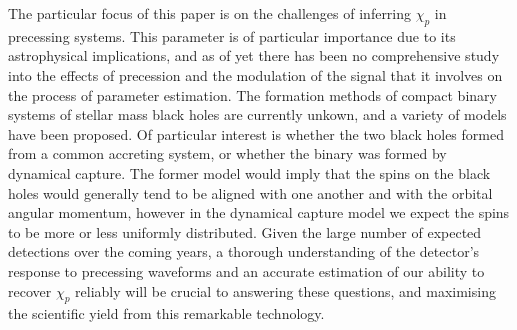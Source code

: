\documentclass[]{article}
\begin{document}
The particular focus of this paper is on the challenges of inferring $\chi_p$ in precessing systems. This parameter is of particular importance due to its astrophysical implications, and as of yet there has been no comprehensive study into the effects of precession and the modulation of the signal that it involves on the process of parameter estimation. The formation methods of compact binary systems of stellar mass black holes are currently unkown, and a variety of models have been proposed\cite{modal}. Of particular interest is whether the two black holes formed from a common accreting system, or whether the binary was formed by dynamical capture. The former model would imply that the spins on the black holes would generally tend to be aligned with one another and with the orbital angular momentum, however in the dynamical capture model we expect the spins to be more or less uniformly distributed. Given the large number of expected detections over the coming years, a thorough understanding of the detector's response to precessing waveforms and an accurate estimation of our ability to recover $\chi_p$ reliably will be crucial to answering these questions, and maximising the scientific yield from this remarkable technology.
\end{document}
